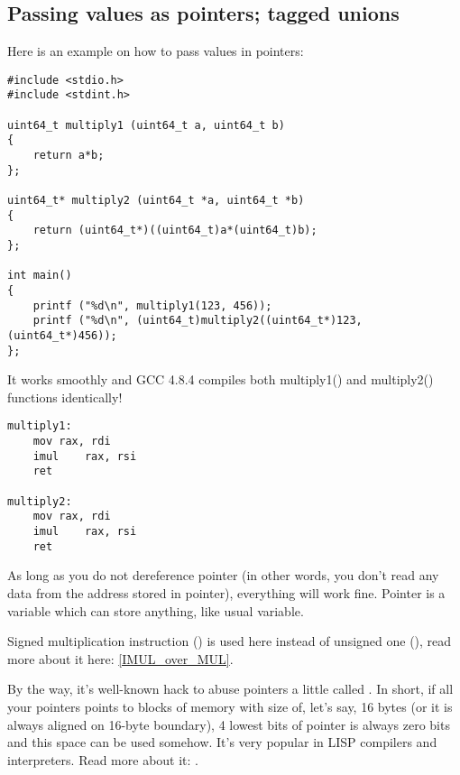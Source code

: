 \subsection{Passing values as pointers; tagged unions}

Here is an example on how to pass values in pointers:

\begin{lstlisting}[label=unsigned_multiply_C]
#include <stdio.h>
#include <stdint.h>

uint64_t multiply1 (uint64_t a, uint64_t b)
{
	return a*b;
};

uint64_t* multiply2 (uint64_t *a, uint64_t *b)
{
	return (uint64_t*)((uint64_t)a*(uint64_t)b);
};

int main()
{
	printf ("%d\n", multiply1(123, 456));
	printf ("%d\n", (uint64_t)multiply2((uint64_t*)123, (uint64_t*)456));
};
\end{lstlisting}

It works smoothly and GCC 4.8.4 compiles both multiply1() and multiply2() functions identically!

\begin{lstlisting}[label=unsigned_multiply_lst]
multiply1:
	mov	rax, rdi
	imul	rax, rsi
	ret

multiply2:
	mov	rax, rdi
	imul	rax, rsi
	ret
\end{lstlisting}

As long as you do not dereference pointer (in other words, you don't read any data from the address stored in pointer), everything will work fine.
Pointer is a variable which can store anything, like usual variable.

Signed multiplication instruction (\IMUL) is used here instead of unsigned one (\MUL), read more about it here:
\ref{IMUL_over_MUL}.

By the way, it's well-known hack to abuse pointers a little called .
In short, if all your pointers points to blocks of memory with size of, let's say, 16 bytes (or it is always aligned on 16-byte boundary), 4 lowest bits of pointer is always zero bits and this space
can be used somehow.
It's very popular in LISP compilers and interpreters.
Read more about it: .


